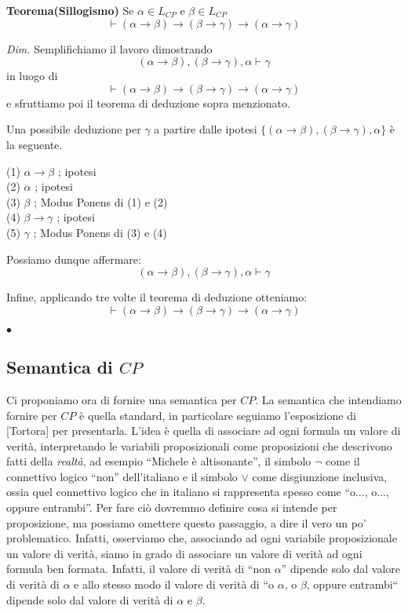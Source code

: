 \documentclass[a4paper, 12pt]{article}
\begin{document}
\begin{flushleft}
\textbf{Teorema(Sillogismo)}
Se $\alpha \in L_{CP}$ e $\beta \in L_{CP}$
$$\vdash (\alpha \rightarrow \beta) \rightarrow
        (\beta \rightarrow \gamma) \rightarrow (\alpha \rightarrow \gamma)$$

\textit{Dim.}
Semplifichiamo il lavoro dimostrando
$$(\alpha \rightarrow \beta),(\beta \rightarrow \gamma),\alpha \vdash \gamma$$
in luogo di
$$\vdash (\alpha \rightarrow \beta) \rightarrow
        (\beta \rightarrow \gamma) \rightarrow (\alpha \rightarrow \gamma)$$
e sfruttiamo poi il teorema di deduzione sopra menzionato.

Una possibile deduzione per $\gamma$ a partire dalle ipotesi
$\{(\alpha \rightarrow \beta),(\beta \rightarrow \gamma),\alpha\}$ è la seguente.

(1) $\alpha \rightarrow \beta$ ; ipotesi \\
(2) $\alpha$ ; ipotesi \\
(3) $\beta$ ; Modus Ponens di (1) e (2) \\
(4) $\beta \rightarrow \gamma$ ; ipotesi \\
(5) $\gamma$ ; Modus Ponens di (3) e (4)

Possiamo dunque affermare:
$$(\alpha \rightarrow \beta),(\beta \rightarrow \gamma),\alpha \vdash \gamma$$

Infine, applicando tre volte il teorema di deduzione otteniamo:
$$\vdash (\alpha \rightarrow \beta) \rightarrow (\beta \rightarrow \gamma) \rightarrow (\alpha \rightarrow \gamma)$$

\begin{flushright}
$\bullet$
\end{flushright}
\end{flushleft}

\subsection{Semantica di $CP$}
Ci proponiamo ora di fornire una semantica per $CP$.
La semantica che intendiamo fornire per $CP$ è quella standard, in particolare
seguiamo l'esposizione di [Tortora] per presentarla.
L'idea è quella di associare ad ogni formula
un valore di verità, interpretando le variabili proposizionali come proposizioni
che descrivono fatti della \textit{realtà}, ad esempio ``Michele è altisonante'',
il simbolo $\neg$ come il connettivo logico ``non'' dell'italiano
e il simbolo $\lor$ come disgiunzione inclusiva, ossia quel connettivo
logico che in italiano si rappresenta spesso come ``o..., o..., oppure entrambi''.
Per fare ciò dovremmo definire cosa si intende per proposizione,
ma possiamo omettere questo passaggio, a dire il vero un po' problematico.
Infatti, osserviamo che, associando ad ogni variabile proposizionale un valore di verità,
siamo in grado di associare un valore di verità ad ogni formula ben formata.
Infatti, il valore di verità di ``non $\alpha$'' dipende solo dal valore di verità
di $\alpha$ e allo stesso modo il valore di verità di
``o $\alpha$, o $\beta$, oppure entrambi``
dipende solo dal valore di verità di $\alpha$ e $\beta$.
\end{document}
